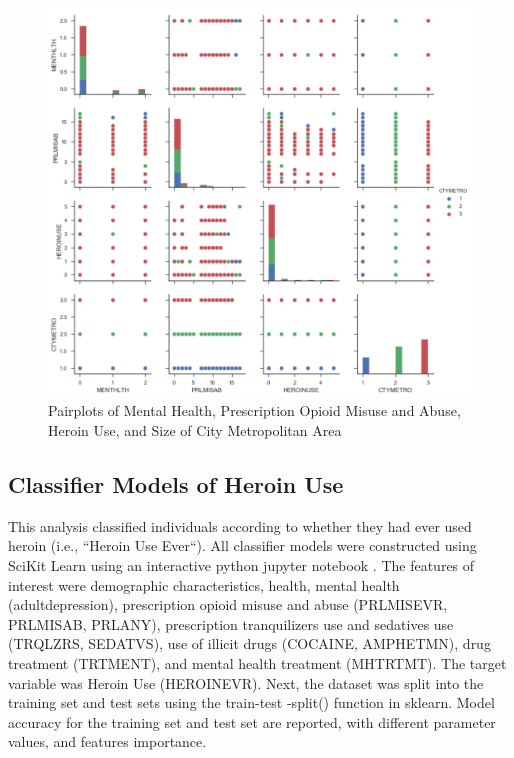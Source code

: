 \documentclass[sigconf]{acmart}
\begin{document}
\begin{figure}[!ht]
  \centering\includegraphics[width=\columnwidth]{images/Figure3.pdf}
  \caption{Pairplots of Mental Health, Prescription Opioid Misuse and Abuse,
  Heroin Use, and Size of City Metropolitan Area}
  \label{f:Figure3}
\end{figure}


\subsection{Classifier Models of Heroin Use}

This analysis classified individuals according to whether they had ever used 
heroin (i.e., ``Heroin Use Ever``). All classifier models were constructed 
using SciKit Learn \cite{muller17} using an interactive python jupyter 
notebook \cite{classifyH}. The features of interest were demographic 
characteristics, health, mental health (adultdepression), prescription 
opioid misuse and abuse (PRLMISEVR, PRLMISAB, PRLANY), prescription 
tranquilizers use and sedatives use (TRQLZRS, SEDATVS), use of illicit drugs 
(COCAINE, AMPHETMN), drug treatment (TRTMENT), and mental health treatment 
(MHTRTMT). The target variable was Heroin Use (HEROINEVR). Next, the 
dataset was split into the training set and test sets using the train-test
-split() function in sklearn. Model accuracy for the training set and test 
set are reported, with different parameter values, and features importance. 
\end{document}
